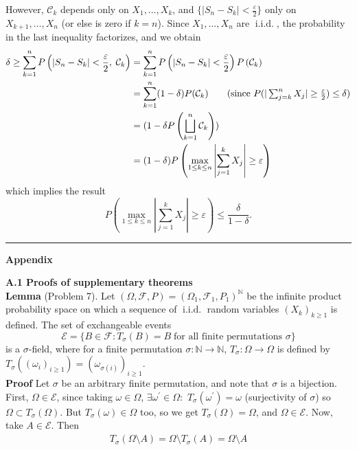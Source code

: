 \documentclass[10pt]{article}
\newcommand{\bp}[1]{\left({#1}\right)}
\newcommand{\mbb}[1]{\mathbb{#1}}
\newcommand{\1}[1]{\mathbbm{1}_{#1}}
\newcommand{\mc}[1]{\mathcal{#1}}
\DeclareMathOperator{\iid}{i.i.d.}
\begin{document}
    However, $\mc{C}_k$ depends only on $X_1,\dots,X_k$, and $\{|S_n-S_k|<\tfrac{\varepsilon}{2}\}$ only on $X_{k+1},\dots,X_n$ (or else is zero if $k=n$). Since $X_1,\dots,X_n$ are $\iid$, the probability in the last inequality factorizes, and we obtain
    \begin{align*}
        \delta\geq\sum_{k=1}^nP\bp{|S_{n}-S_k|<\frac{\varepsilon}{2},\;\mc{C}_k}&=\sum_{k=1}^nP\bp{|S_n-S_k|<\frac{\varepsilon}{2}}P\bp{\mc{C}_k}\\
        &=\sum_{k=1}^n(1-\delta)P(\mc{C}_k)\tag{since $P(|\sum_{j=k}^nX_j|\geq\tfrac{\varepsilon}{2})\leq\delta$}\\
        &=(1-\delta P\bp{\bigsqcup_{k=1}^n\mc{C}_k})\\
        &=(1-\delta)P\bp{\max_{1\leq k\leq n}\left|\sum_{j=1}^kX_j\right|\geq\varepsilon} 
    \end{align*}
    which implies the result
    \[P\bp{\max_{1\leq k\leq n}\left|\sum_{j=1}^kX_j\right|\geq \varepsilon}\leq \frac{\delta}{1-\delta}.\tag*{$\qed$}\]
    \vspace{10pt}
    \hrule
    \begin{center}
        {\bf\large Appendix}
    \end{center}
    {\bf A.1\hspace{5pt} Proofs of supplementary theorems}\\[5pt]
    {\bf Lemma} (Problem 7). Let $(\Omega,\mc{F},P)=(\Omega_1,\mc{F}_1,P_1)^{\mbb{N}}$ be the infinite product probability space on which a sequence of $\iid$ random variables $(X_k)_{k\geq 1}$ is defined. The set of
    exchangeable events
    \[\mc{E}=\{B\in\mc{F}:T_\sigma(B)=B\;\text{for all finite permutations $\sigma$}\}\]
    is a $\sigma$-field, where for a finite permutation $\sigma:\mbb{N}\rightarrow\mbb{N}$, $T_\sigma:\Omega\rightarrow\Omega$ is defined by
    $T_\sigma((\omega_i)_{i\geq 1})=(\omega_{\sigma(i)})_{i\geq 1}$.\\[5pt]
    {\bf Proof}\hspace{5pt} Let $\sigma$ be an arbitrary finite permutation, and note that $\sigma$ is a bijection. First, $\Omega\in\mc{E}$, since
    taking $\omega\in\Omega$, $\exists\omega^\prime\in\Omega:$ $T_\sigma(\omega^\prime)=\omega$ (surjectivity of $\sigma$) so $\Omega\subset T_\sigma(\Omega)$. But $T_\sigma(\omega)\in\Omega$ too, so we get $T_\sigma(\Omega)=\Omega$, and $\Omega\in\mc{E}$. Now, take $A\in\mc{E}$. Then
    \begin{align*}
        T_\sigma(\Omega\setminus A)=\Omega\setminus T_\sigma(A)=\Omega\setminus A
    \end{align*}
\end{document}
